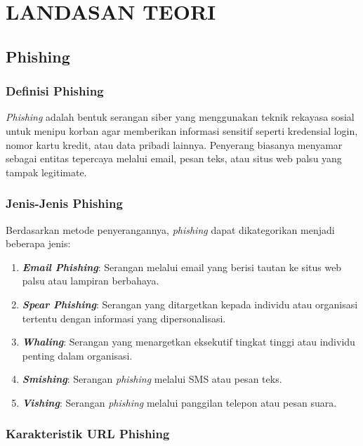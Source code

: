 \chapter{LANDASAN TEORI}

\section{Phishing}

\subsection{Definisi Phishing}

\textit{Phishing} adalah bentuk serangan siber yang menggunakan teknik rekayasa sosial untuk menipu korban agar memberikan informasi sensitif seperti kredensial login, nomor kartu kredit, atau data pribadi lainnya. Penyerang biasanya menyamar sebagai entitas tepercaya melalui email, pesan teks, atau situs web palsu yang tampak legitimate.

\subsection{Jenis-Jenis Phishing}

Berdasarkan metode penyerangannya, \textit{phishing} dapat dikategorikan menjadi beberapa jenis:

\begin{enumerate}
    \item \textbf{\textit{Email Phishing}}: Serangan melalui email yang berisi tautan ke situs web palsu atau lampiran berbahaya.
    
    \item \textbf{\textit{Spear Phishing}}: Serangan yang ditargetkan kepada individu atau organisasi tertentu dengan informasi yang dipersonalisasi.
    
    \item \textbf{\textit{Whaling}}: Serangan yang menargetkan eksekutif tingkat tinggi atau individu penting dalam organisasi.
    
    \item \textbf{\textit{Smishing}}: Serangan \textit{phishing} melalui SMS atau pesan teks.
    
    \item \textbf{\textit{Vishing}}: Serangan \textit{phishing} melalui panggilan telepon atau pesan suara.
\end{enumerate}

\subsection{Karakteristik URL Phishing}

